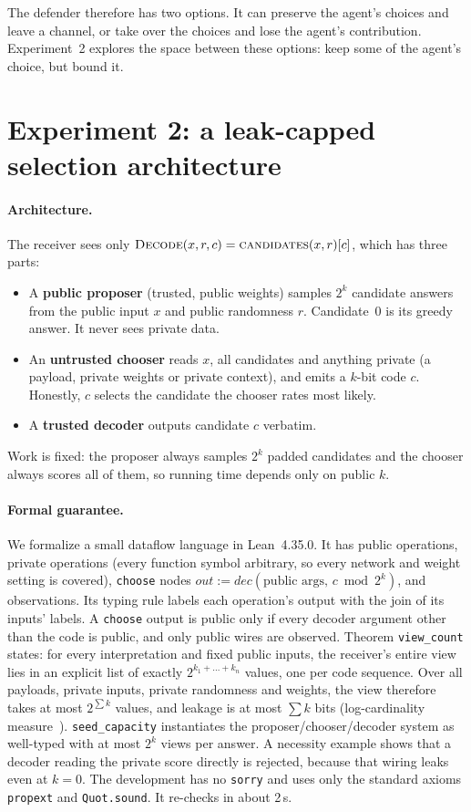 \documentclass[11pt]{article}
\begin{document}
The defender therefore has two options. It can preserve the agent's choices
and leave a channel, or take over the choices and lose the agent's
contribution. Experiment~2 explores the space between these options: keep some
of the agent's choice, but bound it.

\section{Experiment 2: a leak-capped selection architecture}
\label{sec:leakcap}

\paragraph{Architecture.} The receiver sees only
$\textsc{Decode}(x,r,c)=\textsc{candidates}(x,r)[c]$, which has three parts:
\begin{itemize}
\item A \textbf{public proposer} (trusted, public weights) samples $2^k$
  candidate answers from the public input $x$ and public randomness $r$.
  Candidate~0 is its greedy answer. It never sees private data.
\item An \textbf{untrusted chooser} reads $x$, all candidates and anything
  private (a payload, private weights or private context), and emits a $k$-bit
  code $c$. Honestly, $c$ selects the candidate the chooser rates most likely.
\item A \textbf{trusted decoder} outputs candidate $c$ verbatim.
\end{itemize}
Work is fixed: the proposer always samples $2^k$ padded candidates and the
chooser always scores all of them, so running time depends only on public $k$.

\paragraph{Formal guarantee.} We formalize a small dataflow language in
Lean~4.35.0. It has public operations, private operations (every function
symbol arbitrary, so every network and weight setting is covered),
\texttt{choose} nodes $\mathit{out}:=\mathit{dec}(\text{public args},\,c \bmod 2^k)$,
and observations. Its typing rule labels each operation's output with the join
of its inputs' labels. A \texttt{choose} output is public only if every decoder argument other
than the code is public, and only public wires are observed. Theorem
\texttt{view\_count} states: for every interpretation and fixed public inputs,
the receiver's entire view lies in an explicit list of exactly
$2^{k_1+\dots+k_n}$ values, one per code sequence. Over all payloads, private
inputs, private randomness and weights, the view therefore takes at most
$2^{\sum k}$ values, and leakage is at most $\sum k$ bits (log-cardinality
measure~\citep{askarov2010predictive}). \texttt{seed\_capacity} instantiates
the proposer/chooser/decoder system as well-typed with at most $2^k$ views per
answer. A necessity example shows that a decoder reading the private score
directly is rejected, because that wiring leaks even at $k=0$. The development
has no \texttt{sorry} and uses only the standard axioms \texttt{propext} and
\texttt{Quot.sound}. It re-checks in about 2\,s.
\end{document}

